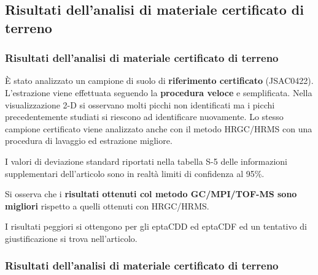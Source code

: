\subsection{Risultati dell'analisi di materiale certificato di terreno}\begin{frame}\frametitle{Risultati dell'analisi di materiale certificato di terreno}
È stato analizzato un campione di suolo di {\bf riferimento certificato} (JSAC0422). \pause L'estrazione viene effettuata seguendo la {\bf procedura veloce} e semplificata. Nella visualizzazione 2-D si osservano molti picchi non identificati ma i picchi precedentemente studiati si riescono ad identificare nuovamente. Lo stesso campione certificato viene analizzato anche con il metodo HRGC/HRMS con una procedura di lavaggio ed estrazione migliore. 

I valori di deviazione standard riportati nella tabella S-5 delle informazioni supplementari dell'articolo sono in realtà limiti di confidenza al 95\%.

Si osserva che i {\bf risultati ottenuti col metodo GC/MPI/TOF-MS sono migliori} rispetto a quelli ottenuti con HRGC/HRMS.

I risultati peggiori si ottengono per gli eptaCDD ed eptaCDF ed un tentativo di giustificazione si trova nell'articolo.
\end{frame}
\logo{}


\begin{frame}\frametitle{Risultati dell'analisi di materiale certificato di terreno}

\begin{figure}{}\end{figure}

\end{frame}

